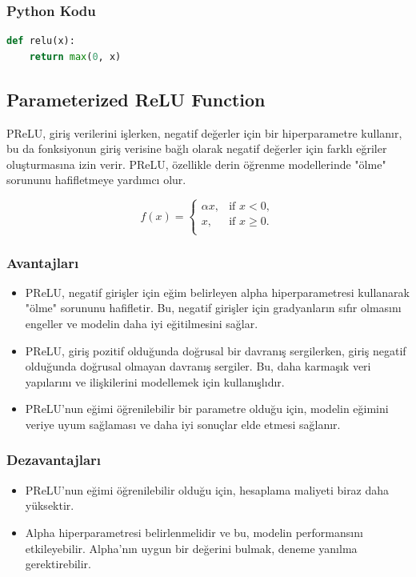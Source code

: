 \subsubsection{Python Kodu}

\begin{lstlisting}[language=Python]
def relu(x):
    return max(0, x)
\end{lstlisting}

\newpage

\subsection{Parameterized ReLU Function}
PReLU, giriş verilerini işlerken, negatif değerler için bir hiperparametre kullanır, bu da fonksiyonun giriş verisine bağlı olarak negatif değerler için farklı eğriler oluşturmasına izin verir. PReLU, özellikle derin öğrenme modellerinde "ölme" sorununu hafifletmeye yardımcı olur.

\[f(x) = \begin{cases} 
\alpha x, & \text{if } x < 0, \\
x, & \text{if } x \geq 0. \\
\end{cases}
\]

\subsubsection{Avantajları}
\begin{itemize}
    \item PReLU, negatif girişler için eğim belirleyen alpha hiperparametresi kullanarak "ölme" sorununu hafifletir. Bu, negatif girişler için gradyanların sıfır olmasını engeller ve modelin daha iyi eğitilmesini sağlar.
    \item PReLU, giriş pozitif olduğunda doğrusal bir davranış sergilerken, giriş negatif olduğunda doğrusal olmayan davranış sergiler. Bu, daha karmaşık veri yapılarını ve ilişkilerini modellemek için kullanışlıdır.
    \item PReLU'nun eğimi öğrenilebilir bir parametre olduğu için, modelin eğimini veriye uyum sağlaması ve daha iyi sonuçlar elde etmesi sağlanır.
\end{itemize}

\subsubsection{Dezavantajları}
\begin{itemize}
    \item PReLU'nun eğimi öğrenilebilir olduğu için, hesaplama maliyeti biraz daha yüksektir.
    \item Alpha hiperparametresi belirlenmelidir ve bu, modelin performansını etkileyebilir. Alpha'nın uygun bir değerini bulmak, deneme yanılma gerektirebilir.
\end{itemize}

